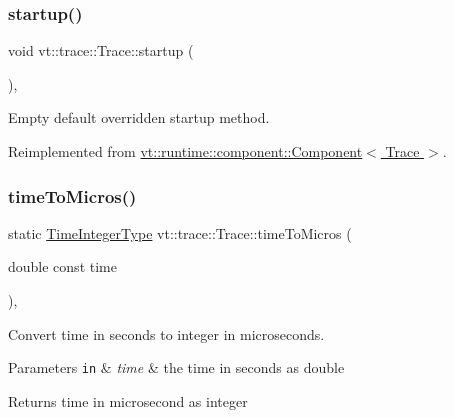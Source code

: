 \subsubsection{\texorpdfstring{startup()}{startup()}}
{\footnotesize\ttfamily void vt\+::trace\+::\+Trace\+::startup (\begin{DoxyParamCaption}{ }\end{DoxyParamCaption})\hspace{0.3cm}{\ttfamily [override]}, {\ttfamily [virtual]}}



Empty default overridden startup method. 



Reimplemented from \hyperlink{structvt_1_1runtime_1_1component_1_1_component_aad3974307ab3b2e1df389a91310f68c2}{vt\+::runtime\+::component\+::\+Component$<$ Trace $>$}.

\mbox{\label{structvt_1_1trace_1_1_trace_a4f271a172e5b1d3bfe7f61d9443b9146}} 
\subsubsection{\texorpdfstring{time\+To\+Micros()}{timeToMicros()}}
{\footnotesize\ttfamily static \hyperlink{structvt_1_1trace_1_1_trace_ab8db9218a8ab87f59773fcbf81433787}{Time\+Integer\+Type} vt\+::trace\+::\+Trace\+::time\+To\+Micros (\begin{DoxyParamCaption}\item[{double const}]{time }\end{DoxyParamCaption})\hspace{0.3cm}{\ttfamily [inline]}, {\ttfamily [static]}}



Convert time in seconds to integer in microseconds. 


\begin{DoxyParams}[1]{Parameters}
\mbox{\tt in}  & {\em time} & the time in seconds as double\\
\hline
\end{DoxyParams}
\begin{DoxyReturn}{Returns}
time in microsecond as integer 
\end{DoxyReturn}
\mbox{\label{structvt_1_1trace_1_1_trace_ad2511af5eeb837db4360a6e30b12aebb}} 
